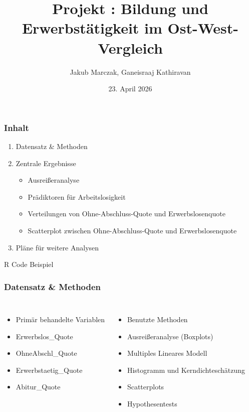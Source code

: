 \documentclass[10pt, aspectratio=169]{beamer}
\date{23. April 2026}
\title[Bildung und Erwerbstätigkeit im Ost-West-Vergleich]{Projekt \MakeUppercase{\romannumeral 1}: Bildung und Erwerbstätigkeit im Ost-West-Vergleich}
\author[J. Marczak, G. Kathiravan]{Jakub Marczak, Ganeisraaj Kathiravan}
\begin{document}
\begin{frame}[plain]
  \titlepage
\end{frame}

\begin{frame}
    \frametitle{Inhalt}
    \begin{enumerate}
        \item Datensatz \& Methoden
        \item Zentrale Ergebnisse
        \begin{itemize}
            \item Ausreißeranalyse
            \item Prädiktoren für Arbeitslosigkeit
            \item Verteilungen von Ohne-Abschluss-Quote und Erwerbslosenquote
            \item Scatterplot zwischen Ohne-Abschluss-Quote und Erwerbslosenquote
        \end{itemize}
        \item Pläne für weitere Analysen
    \end{enumerate}
\end{frame}

\begin{frame}[fragile]{R Code Beispiel}
    \frametitle{Datensatz \& Methoden}
	\begin{columns}[T]
	
        \begin{itemize}
            \item Primär behandelte Variablen
            \item[$\rightarrow$] Erwerbslos\_Quote
            \item[$\rightarrow$] OhneAbschl\_Quote
            \item[$\rightarrow$] Erwerbstaetig\_Quote
            \item[$\rightarrow$] Abitur\_Quote
        \end{itemize}
        
        \begin{itemize}
            \item Benutzte Methoden
            \item[$\rightarrow$] Ausreißeranalyse (Boxplots)
            \item[$\rightarrow$] Multiples Lineares Modell
            \item[$\rightarrow$] Histogramm und Kerndichteschätzung
            \item[$\rightarrow$] Scatterplots
            \item[$\rightarrow$] Hypothesentests
        \end{itemize}
        \end{columns}
\end{frame}
\end{document}
